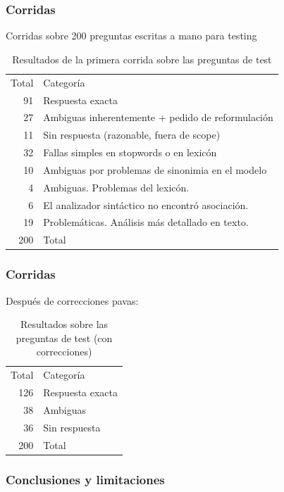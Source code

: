 \begin{frame}
\frametitle{Corridas}
Corridas sobre 200 preguntas escritas a mano para testing
\begin{center}
\begin{table}[h]
\centering
\begin{tabular}{| r |  p{12cm} | }

Total & Categoría \\ 
91 & Respuesta exacta \\ 
27 & Ambiguas inherentemente + pedido de reformulación \\ 
11 & Sin respuesta (razonable, fuera de scope) \\
32 & Fallas simples en stopwords o en lexicón \\
10 & Ambiguas por problemas de sinonimia en el modelo \\
4 & Ambiguas. Problemas del lexicón. \\
6 & El analizador sintáctico no encontró asociación. \\
19 & Problemáticas. Análisis más detallado en texto. \\
200 & Total \\
\end{tabular}
\caption{Resultados de la primera corrida sobre las preguntas de test}
\label{table:popescu-results-1}
\end{table}
\end{center}
\end{frame}

\begin{frame}
\frametitle{Corridas}
Después de correcciones pavas:
\begin{center}
\begin{table}[h]
\centering
\begin{tabular}{| r |  p{12cm} |}
Total & Categoría \\ 
126 & Respuesta exacta \\ 
38 & Ambiguas \\ 
36 & Sin respuesta\\ 
200 & Total \\ 

\end{tabular}
\caption{Resultados sobre las preguntas de test (con correcciones)}
\label{table:popescu-results-3}
\end{table}
\end{center}
\end{frame}


\subsubsection*{Conclusiones y limitaciones}

